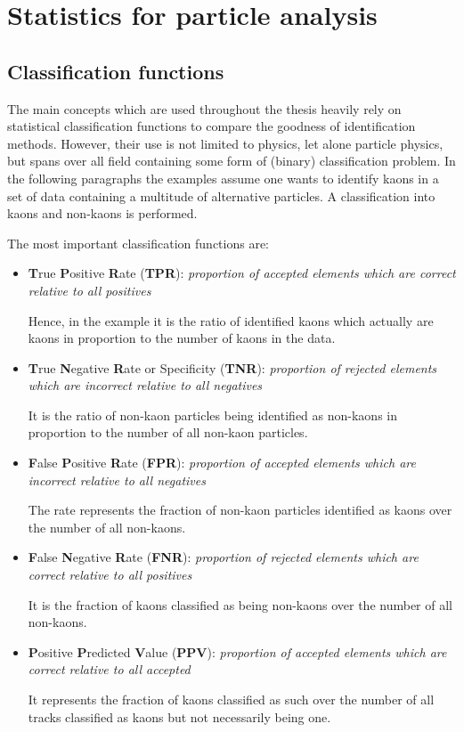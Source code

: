 \chapter{Statistics for particle analysis}
\label{chap:statistics}

\section{Classification functions}
\label{sec:classification_functions}

The main concepts which are used throughout the thesis heavily rely on statistical classification functions to compare the goodness of identification methods. However, their use is not limited to physics, let alone particle physics, but spans over all field containing some form of (binary) classification problem.
In the following paragraphs the examples assume one wants to identify kaons in a set of data containing a multitude of alternative particles. A classification into kaons and non-kaons is performed.

The most important classification functions are:
\begin{itemize}
	\item \textbf{T}rue \textbf{P}ositive \textbf{R}ate (\textbf{TPR}): \textit{proportion of accepted elements which are correct relative to all positives}

	\nobreak
	Hence, in the example it is the ratio of identified kaons which actually are kaons in proportion to the number of kaons in the data.

	\item \textbf{T}rue \textbf{N}egative \textbf{R}ate or Specificity (\textbf{TNR}): \textit{proportion of rejected elements which are incorrect relative to all negatives}

	\nobreak
	It is the ratio of non-kaon particles being identified as non-kaons in proportion to the number of all non-kaon particles.

	\item \textbf{F}alse \textbf{P}ositive \textbf{R}ate (\textbf{FPR}): \textit{proportion of accepted elements which are incorrect relative to all negatives}

	\nobreak
	The rate represents the fraction of non-kaon particles identified as kaons over the number of all non-kaons.

	\item \textbf{F}alse \textbf{N}egative \textbf{R}ate (\textbf{FNR}): \textit{proportion of rejected elements which are correct relative to all positives}

	\nobreak
	It is the fraction of kaons classified as being non-kaons over the number of all non-kaons.

	\item \textbf{P}ositive \textbf{P}redicted \textbf{V}alue (\textbf{PPV}): \textit{proportion of accepted elements which are correct relative to all accepted}

	\nobreak
	It represents the fraction of kaons classified as such over the number of all tracks classified as kaons but not necessarily being one.

\end{itemize}

